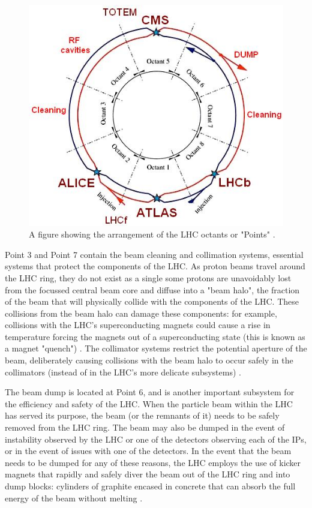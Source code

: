 \documentclass[12pt,a4paper,epsf,portrait,times,epsfig]{article}
\begin{document}
		\begin{figure}
			\centering
			\includegraphics[scale=0.5]{LHC_Octants}
			\caption{A figure showing the arrangement of the LHC octants or "Points" \cite{Evans_2008}.}
			\label{Fig:CERNOctants}
		\end{figure}

		Point 3 and Point 7 contain the beam cleaning and collimation systems, essential systems that protect the components of the LHC. As proton beams travel around the LHC ring, they do not exist as a single some protons are unavoidably lost from the focussed central beam core and diffuse into a "beam halo", the fraction of the beam that will physically collide with the components of the LHC. These collisions from the beam halo can damage these components: for example, collisions with the LHC's superconducting magnets could cause a rise in temperature forcing the magnets out of a superconducting state (this is known as a magnet "quench") \cite{LHCCollimation1}. The collimator systems restrict the potential aperture of the beam, deliberately causing collisions with the beam halo to occur safely in the collimators (instead of in the LHC's more delicate subsystems) \cite{LHCCollimation2}. \par 

		The beam dump is located at Point 6, and is another important subsystem for the efficiency and safety of the LHC. When the particle beam within the LHC has served its purpose, the beam (or the remnants of it) needs to be safely removed from the LHC ring. The beam may also be dumped in the event of instability observed by the LHC or one of the detectors observing each of the IPs, or in the event of issues with one of the detectors. In the event that the beam needs to be dumped for any of these reasons, the LHC employs the use of kicker magnets that rapidly and safely diver the beam out of the LHC ring and into dump blocks: cylinders of graphite encased in concrete that can absorb the full energy of the beam without melting \cite{LHCDesignV2}. \par 
		
\end{document}
